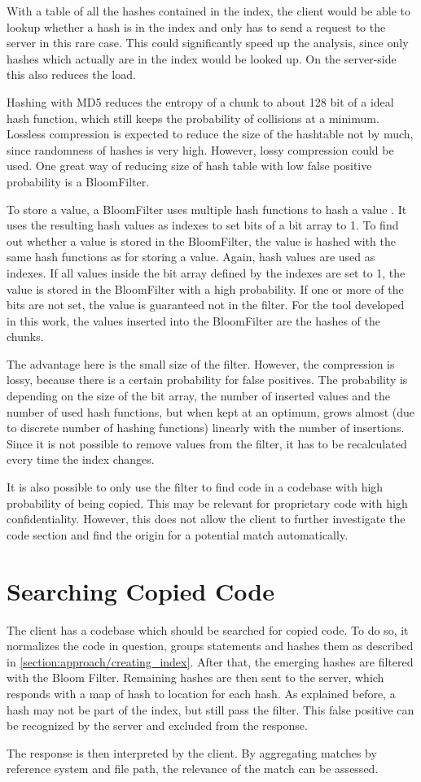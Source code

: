 With a table of all the hashes contained in the index, the client would be able to lookup whether a hash is in the index and only has to send a request to the server in this rare case.
This could significantly speed up the analysis, since only hashes which actually are in the index would be looked up.
On the server-side this also reduces the load.

Hashing with MD5 reduces the entropy of a chunk to about 128 bit of a ideal hash function, which still keeps the probability of collisions at a minimum.
Lossless compression is expected to reduce the size of the hashtable not by much, since randomness of hashes is very high.
However, lossy compression could be used.
One great way of reducing size of hash table with low false positive probability is a BloomFilter.

To store a value, a BloomFilter uses multiple hash functions to hash a value \cite{bloom1970filter}.
It uses the resulting hash values as indexes to set bits of a bit array to 1.
To find out whether a value is stored in the BloomFilter, the value is hashed with the same hash functions as for storing a value.
Again, hash values are used as indexes.
If all values inside the bit array defined by the indexes are set to 1, the value is stored in the BloomFilter with a high probability.
If one or more of the bits are not set, the value is guaranteed not in the filter.
For the tool developed in this work, the values inserted into the BloomFilter are the hashes of the chunks.

The advantage here is the small size of the filter.
However, the compression is lossy, because there is a certain probability for false positives.
The probability is depending on the size of the bit array, the number of inserted values and the number of used hash functions, but when kept at an optimum, grows almost (due to discrete number of hashing functions) linearly with the number of insertions.
Since it is not possible to remove values from the filter, it has to be recalculated every time the index changes.

It is also possible to only use the filter to find code in a codebase with high probability of being copied.
This may be relevant for proprietary code with high confidentiality.
However, this does not allow the client to further investigate the code section and find the origin for a potential match automatically.
	
\section{Searching Copied Code}\label{section:approach/searching_copied_code}
The client has a codebase which should be searched for copied code.
To do so, it normalizes the code in question, groups statements and hashes them as described in \autoref{section:approach/creating_index}.
After that, the emerging hashes are filtered with the Bloom Filter.
Remaining hashes are then sent to the server, which responds with a map of hash to location for each hash.
As explained before, a hash may not be part of the index, but still pass the filter.
This false positive can be recognized by the server and excluded from the response.

The response is then interpreted by the client.
By aggregating matches by reference system and file path, the relevance of the match can be assessed.
